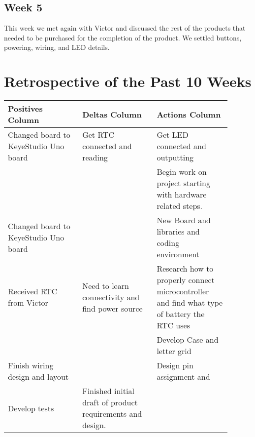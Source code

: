 \documentclass[onecolumn, draftclsnofoot,10pt, compsoc]{IEEEtran}
\begin{document}
\subsection{Week 5}
This week we met again with Victor and discussed the rest of the products that needed to be purchased for the completion of the product.
We settled buttons, powering, wiring, and LED details.

\newpage
\section{Retrospective of the Past 10 Weeks}
\vspace{2mm}
\begin{center}
\begin{tabular}{| p{0.3\linewidth} | p{0.3\linewidth} | p{0.3\linewidth} |}
\hline
Positives Column &
Deltas Column &
Actions Column \\
\hline
Changed board to KeyeStudio Uno board &
Get RTC connected and reading &
Get LED connected and outputting \\
\hline
 &
 &
Begin work on project starting with hardware related steps.  \\
\hline
Changed board to KeyeStudio Uno board &
 &
New Board and libraries and coding environment \\
\hline
Received RTC from Victor & 
Need to learn connectivity and find power source &
Research how to properly connect microcontroller and find what type of battery the RTC uses \\
\hline
 &
 &
Develop Case and letter grid \\
\hline
Finish wiring design and layout &
&
Design pin assignment and \\
\hline
Develop tests &
Finished initial draft of product requirements and design. &
\\
\hline


\end{tabular}
\end{center}
\end{document}
